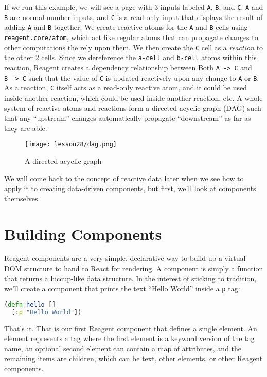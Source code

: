 \documentclass[10pt,twoside,openright]{memoir}
\begin{document}
If we run this example, we will see a page with 3 inputs labeled
\texttt{A}, \texttt{B}, and \texttt{C}. \texttt{A} and \texttt{B} are
normal number inputs, and \texttt{C} is a read-only input that displays
the result of adding \texttt{A} and \texttt{B} together. We create
reactive atoms for the \texttt{A} and \texttt{B} cells using
\texttt{reagent.core/atom}, which act like regular atoms that can
propagate changes to other computations the rely upon them. We then
create the \texttt{C} cell as a \emph{reaction} to the other 2 cells.
Since we dereference the \texttt{a-cell} and \texttt{b-cell} atoms
within this reaction, Reagent creates a dependency relationship between
Both \texttt{A\ -\textgreater{}\ C} and \texttt{B\ -\textgreater{}\ C}
such that the value of \texttt{C} is updated reactively upon any change
to \texttt{A} or \texttt{B}. As a reaction, \texttt{C} itself acts as a
read-only reactive atom, and it could be used inside another reaction,
which could be used inside another reaction, etc. A whole system of
reactive atoms and reactions form a directed acyclic graph (DAG) such
that any ``upstream'' changes automatically propagate ``downstream'' as
far as they are able.

\begin{figure}[H]
\caption{A directed acyclic graph}
\centering
\texttt{[image: lesson28/dag.png]}
\end{figure}


We will come back to the concept of reactive data later when we see how
to apply it to creating data-driven components, but first, we'll look at
components themselves.


\section{Building Components}

Reagent components are a very simple, declarative way to build up a
virtual DOM structure to hand to React for rendering. A component is
simply a function that returns a hiccup-like data structure. In the
interest of sticking to tradition, we'll create a component that prints
the text ``Hello World'' inside a \texttt{p} tag:

\begin{lstlisting}[language=Clojure]
(defn hello []
  [:p "Hello World"])
\end{lstlisting}

That's it. That is our first Reagent component that defines a single
element. An element represents a tag where the first element is a
keyword version of the tag name, an optional second element can contain
a map of attributes, and the remaining items are children, which can be
text, other elements, or other Reagent components.
\end{document}
